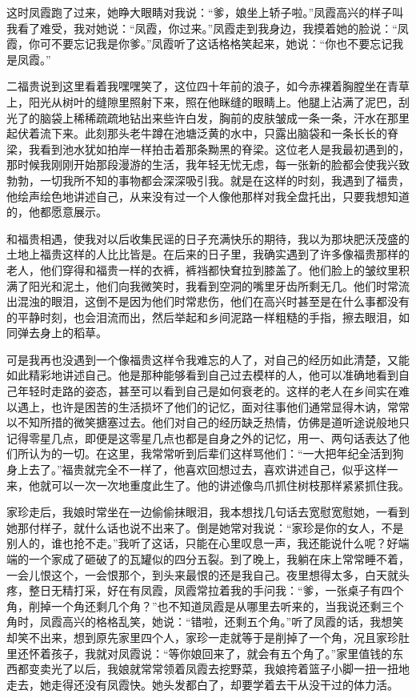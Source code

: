 \documentclass[12pt,UTF8]{ctexbook}
\begin{document}
这时凤霞跑了过来，她睁大眼睛对我说：“爹，娘坐上轿子啦。”凤霞高兴的样子叫我看了难受，我对她说：“凤霞，你过来。”凤霞走到我身边，我摸着她的脸说：“凤霞，你可不要忘记我是你爹。”凤霞听了这话格格笑起来，她说：“你也不要忘记我是凤霞。”

二福贵说到这里看着我嘿嘿笑了，这位四十年前的浪子，如今赤裸着胸膛坐在青草上，阳光从树叶的缝隙里照射下来，照在他眯缝的眼睛上。他腿上沾满了泥巴，刮光了的脑袋上稀稀疏疏地钻出来些许白发，胸前的皮肤皱成一条一条，汗水在那里起伏着流下来。此刻那头老牛蹲在池塘泛黄的水中，只露出脑袋和一条长长的脊梁，我看到池水犹如拍岸一样拍击着那条黝黑的脊梁。这位老人是我最初遇到的，那时候我刚刚开始那段漫游的生活，我年轻无忧无虑，每一张新的脸都会使我兴致勃勃，一切我所不知的事物都会深深吸引我。就是在这样的时刻，我遇到了福贵，他绘声绘色地讲述自己，从来没有过一个人像他那样对我全盘托出，只要我想知道的，他都愿意展示。

和福贵相遇，使我对以后收集民谣的日子充满快乐的期待，我以为那块肥沃茂盛的土地上福贵这样的人比比皆是。在后来的日子里，我确实遇到了许多像福贵那样的老人，他们穿得和福贵一样的衣裤，裤裆都快耷拉到膝盖了。他们脸上的皱纹里积满了阳光和泥土，他们向我微笑时，我看到空洞的嘴里牙齿所剩无几。他们时常流出混浊的眼泪，这倒不是因为他们时常悲伤，他们在高兴时甚至是在什么事都没有的平静时刻，也会泪流而出，然后举起和乡间泥路一样粗糙的手指，擦去眼泪，如同弹去身上的稻草。

可是我再也没遇到一个像福贵这样令我难忘的人了，对自己的经历如此清楚，又能如此精彩地讲述自己。他是那种能够看到自己过去模样的人，他可以准确地看到自己年轻时走路的姿态，甚至可以看到自己是如何衰老的。这样的老人在乡间实在难以遇上，也许是困苦的生活损坏了他们的记忆，面对往事他们通常显得木讷，常常以不知所措的微笑搪塞过去。他们对自己的经历缺乏热情，仿佛是道听途说般地只记得零星几点，即便是这零星几点也都是自身之外的记忆，用一、两句话表达了他们所认为的一切。在这里，我常常听到后辈们这样骂他们：“一大把年纪全活到狗身上去了。”福贵就完全不一样了，他喜欢回想过去，喜欢讲述自己，似乎这样一来，他就可以一次一次地重度此生了。他的讲述像鸟爪抓住树枝那样紧紧抓住我。

家珍走后，我娘时常坐在一边偷偷抹眼泪，我本想找几句话去宽慰宽慰她，一看到她那付样子，就什么话也说不出来了。倒是她常对我说：“家珍是你的女人，不是别人的，谁也抢不走。”我听了这话，只能在心里叹息一声，我还能说什么呢？好端端的一个家成了砸破了的瓦罐似的四分五裂。到了晚上，我躺在床上常常睡不着，一会儿恨这个，一会恨那个，到头来最恨的还是我自己。夜里想得太多，白天就头疼，整日无精打采，好在有凤霞，凤霞常拉着我的手问我：“爹，一张桌子有四个角，削掉一个角还剩几个角？”也不知道凤霞是从哪里去听来的，当我说还剩三个角时，凤霞高兴的格格乱笑，她说：“错啦，还剩五个角。”听了凤霞的话，我想笑却笑不出来，想到原先家里四个人，家珍一走就等于是削掉了一个角，况且家珍肚里还怀着孩子，我就对凤霞说：“等你娘回来了，就会有五个角了。”家里值钱的东西都变卖光了以后，我娘就常常领着凤霞去挖野菜，我娘挎着篮子小脚一扭一扭地走去，她走得还没有凤霞快。她头发都白了，却要学着去干从没干过的体力活。
\end{document}
